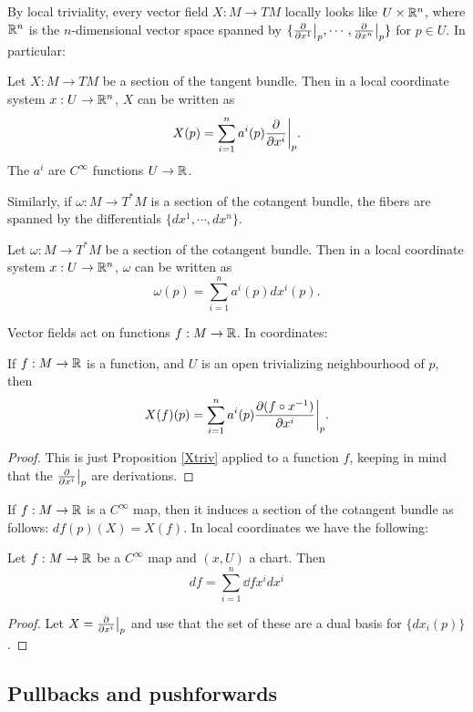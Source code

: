 \documentclass[11pt, english]{article}
\begin{document}
By local triviality, every vector field $X:M \to TM$ locally looks like $U \times \mathbb{R}^n$, where $\mathbb{R}^n$ is the $n$-dimensional vector space spanned by $\{ \restr{\dd{}{x^1}}{p},\cdots,\restr{\dd{}{x^n}}{p} \}$ for $p \in U$. In particular:

\begin{prop}
\label{Xtriv}
Let $X:M \to TM$ be a section of the tangent bundle. Then in a local coordinate system $x:U \to \mathbb{R}^n$, $X$ can be written as
\[
X(p) = \sum_{i=1}^n  a^i(p) \restr{\dd{}{x^i}}{p}.
\]
The $a^i$ are $C^\infty$ functions $U \to \mathbb{R}$.
\end{prop}

Similarly, if $\omega:M \to T^\ast M$ is a section of the cotangent bundle, the fibers are spanned by the differentials $\{dx^1,\cdots, dx^n \}$.

\begin{prop}
Let $\omega:M \to T^\ast M$ be a section of the cotangent bundle. Then in a local coordinate system $x:U \to \mathbb{R}^n$, $\omega$ can be written as
\[
\omega(p) = \sum_{i=1}^n a^i(p) dx^i(p).
\]
\end{prop}

Vector fields act on functions $f:M \to \mathbb{R}$. In coordinates:
\begin{prop}
\label{Xftriv}
If $f:M \to \mathbb{R}$ is a function, and $U$ is an open trivializing neighbourhood of $p$, then
\[
X(f)(p) = \sum_{i=1}^n a^i(p)\restr{\dd{(f \circ x^{-1})}{x^i}}{p}.
\]
\end{prop}
\begin{proof}
This is just Proposition \ref{Xtriv} applied to a function $f$, keeping in mind that the $\restr{\dd{}{x^i}}{p}$ are derivations.
\end{proof}

If $f:M \to \mathbb{R}$ is a $C^\infty$ map, then it induces a section of the cotangent bundle as follows: $df(p)(X)=X(f)$. In local coordinates we have the following:
\begin{prop}
\label{df}
Let $f:M \to \mathbb{R}$ be a $C^\infty$ map and $(x,U)$ a chart. Then
\[
df = \sum_{i=1}^n \dd{f}{x^i} dx^i
\]
\end{prop}
\begin{proof}
Let $X = \restr{\dd{}{x^i}}{p}$ and use that the set of these are a dual basis for $\{ dx_i(p) \}$.
\end{proof}

\subsection{Pullbacks and pushforwards}
\end{document}
